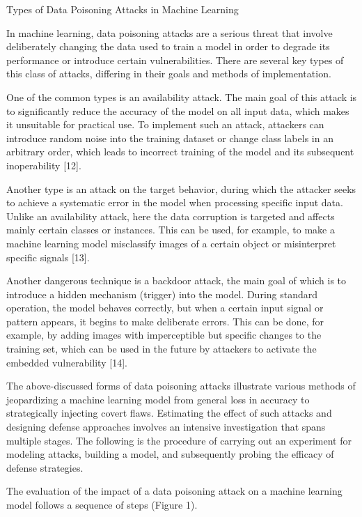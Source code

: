 \begin{multicols}{2}
Types of Data Poisoning Attacks in Machine Learning

In machine learning, data poisoning attacks are a serious threat that
involve deliberately changing the data used to train a model in order to
degrade its performance or introduce certain vulnerabilities. There are
several key types of this class of attacks, differing in their goals and
methods of implementation.

One of the common types is an availability attack. The main goal of this
attack is to significantly reduce the accuracy of the model on all input
data, which makes it unsuitable for practical use. To implement such an
attack, attackers can introduce random noise into the training dataset
or change class labels in an arbitrary order, which leads to incorrect
training of the model and its subsequent inoperability {[}12{]}.

Another type is an attack on the target behavior, during which the
attacker seeks to achieve a systematic error in the model when
processing specific input data. Unlike an availability attack, here the
data corruption is targeted and affects mainly certain classes or
instances. This can be used, for example, to make a machine learning
model misclassify images of a certain object or misinterpret specific
signals {[}13{]}.

Another dangerous technique is a backdoor attack, the main goal of which
is to introduce a hidden mechanism (trigger) into the model. During
standard operation, the model behaves correctly, but when a certain
input signal or pattern appears, it begins to make deliberate errors.
This can be done, for example, by adding images with imperceptible but
specific changes to the training set, which can be used in the future by
attackers to activate the embedded vulnerability {[}14{]}.

The above-discussed forms of data poisoning attacks illustrate various
methods of jeopardizing a machine learning model from general loss in
accuracy to strategically injecting covert flaws. Estimating the effect
of such attacks and designing defense approaches involves an intensive
investigation that spans multiple stages. The following is the procedure
of carrying out an experiment for modeling attacks, building a model,
and subsequently probing the efficacy of defense strategies.

The evaluation of the impact of a data poisoning attack on a machine
learning model follows a sequence of steps (Figure 1).
\end{multicols}

